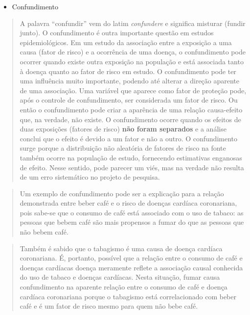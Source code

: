 \documentclass[
]{book}
\providecommand{\tightlist}{%
  \setlength{\itemsep}{0pt}\setlength{\parskip}{0pt}}
\begin{document}
\hfill\break

\begin{itemize}
\tightlist
\item
  Confundimento
\end{itemize}

\hfill\break

\begin{quote}
A palavra ``confundir'' vem do latim \emph{confundere} e significa misturar (fundir junto). O confundimento é outra importante questão em estudos epidemiológicos. Em um estudo da associação entre a exposição a uma causa (fator de risco) e a ocorrência de uma doença, o confundimento pode ocorrer quando existe outra exposição na população e está associada tanto à doença quanto ao fator de risco em estudo. O confundimento pode ter uma influência muito importante, podendo até alterar a direção aparente de uma associação. Uma variável que aparece como fator de proteção pode, após o controle de confundimento, ser considerada um fator de risco. Ou então o confundimento pode criar a aparência de uma relação causa-efeito que, na verdade, não existe. O confundimento ocorre quando os efeitos de duas exposições (fatores de risco) \textbf{não foram separados} e a análise conclui que o efeito é devido a um fator e não a outro. O confundimento surge porque a distribuição não aleatória de fatores de risco na fonte também ocorre na população de estudo, fornecendo estimativas enganosas de efeito. Nesse sentido, pode parecer um viés, mas na verdade não resulta de um erro sistemático no projeto de pesquisa.
\end{quote}

\hfill\break

\begin{quote}
Um exemplo de confundimento pode ser a explicação para a relação demonstrada entre beber café e o risco de doenças cardíaca coronariana, pois sabe-se que o consumo de café está associado com o uso de tabaco: as pessoas que bebem café são mais propensos a fumar do que as pessoas que não bebem café.
\end{quote}

\hfill\break

\begin{quote}
Também é sabido que o tabagismo é uma causa de doença cardíaca coronariana. É, portanto, possível que a relação entre o consumo de café e doenças cardíacas doença meramente reflete a associação causal conhecida do uso de tabaco e doenças cardíacas. Nesta situação, fumar causa confundimento na aparente relação entre o consumo de café e doença cardíaca coronariana porque o tabagismo está correlacionado com beber café e é um fator de risco mesmo para quem não bebe café.
\end{quote}
\end{document}
